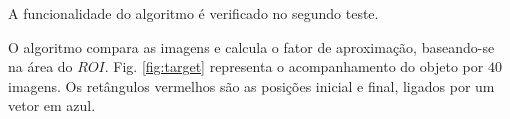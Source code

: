 A funcionalidade do algoritmo é verificado no segundo teste.

O algoritmo compara as imagens e calcula o fator de aproximação, 
baseando-se na área do $ROI$. Fig. \ref{fig:target} representa o 
acompanhamento do objeto por $40$ imagens. Os retângulos vermelhos
são as posições inicial e final, ligados por um vetor em azul.

